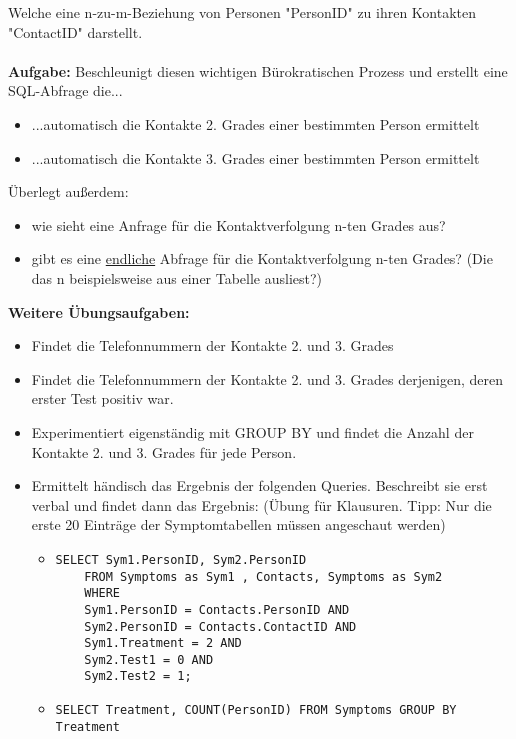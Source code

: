 \documentclass[]{article}
\begin{document}
Welche eine n-zu-m-Beziehung von Personen "PersonID" zu ihren Kontakten "ContactID" darstellt.\\\ \\


\textbf{Aufgabe:} Beschleunigt diesen wichtigen Bürokratischen Prozess und erstellt eine SQL-Abfrage die...
\begin{itemize}
	\item ...automatisch die Kontakte 2. Grades einer bestimmten Person ermittelt
	\item ...automatisch die Kontakte 3. Grades einer bestimmten Person ermittelt
\end{itemize}
Überlegt außerdem:
\begin{itemize}
	\item wie sieht eine Anfrage für die Kontaktverfolgung n-ten Grades aus?
	\item gibt es eine \underline{endliche} Abfrage für die Kontaktverfolgung n-ten Grades? (Die das n beispielsweise aus einer Tabelle ausliest?)
\end{itemize}

\textbf{Weitere Übungsaufgaben:}
\begin{itemize}
	\item Findet die Telefonnummern der Kontakte 2. und 3. Grades
	\item Findet die Telefonnummern der Kontakte 2. und 3. Grades derjenigen, deren erster Test positiv war. 
	\item Experimentiert eigenständig mit GROUP BY und findet die Anzahl der Kontakte 2. und 3. Grades für jede Person.
	\item Ermittelt händisch das Ergebnis der folgenden Queries. Beschreibt sie erst verbal und findet dann das Ergebnis: (Übung für Klausuren. Tipp: Nur die erste 20 Einträge der Symptomtabellen müssen angeschaut werden) \\
	\begin{itemize}\newpage
	\item  \begin{verbatim}
SELECT Sym1.PersonID, Sym2.PersonID 
	FROM Symptoms as Sym1 , Contacts, Symptoms as Sym2 
    WHERE 
    Sym1.PersonID = Contacts.PersonID AND
    Sym2.PersonID = Contacts.ContactID AND
    Sym1.Treatment = 2 AND
    Sym2.Test1 = 0 AND
    Sym2.Test2 = 1;		
		\end{verbatim}
	\item \begin{verbatim}
SELECT Treatment, COUNT(PersonID) FROM Symptoms GROUP BY Treatment
	\end{verbatim}
	\end{itemize}
\end{itemize}
\end{document}
